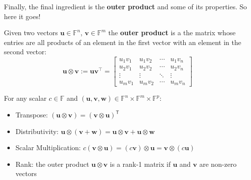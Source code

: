 \documentclass[../lecture-notes.tex]{subfiles}
\begin{document}
Finally, the final ingredient is the \textbf{outer product} and some of its properties. So here it goes!

\begin{definition}
    Given two vectors $\mathbf{u} \in \mathbb{F}^n$, $\mathbf{v} \in \mathbb{F}^m$ the \textbf{outer product} is a
    the matrix whose entries are all products of an element in the first vector with an element 
    in the second vector:
    \begin{equation*}
        \mathbf{u} \otimes \mathbf{v} := \mathbf{u}\mathbf{v}^{\top} = \begin{bmatrix}
            u_1 v_1 & u_1 v_2 & \cdots & u_1 v_n \\
            u_2 v_1 & u_2 v_2 & \cdots & u_2 v_n \\
            \vdots & \vdots & \ddots & \vdots \\
            u_m v_1 & u_m v_2 & \cdots & u_m v_n
        \end{bmatrix}
    \end{equation*}
\end{definition}

\begin{lemma}
    For any scalar $c \in \mathbb{F}$ and $(\mathbf{u}, \mathbf{v}, \mathbf{w}) \in \mathbb{F}^n \times \mathbb{F}^m \times \mathbb{F}^p$:
    \begin{itemize}
        \item Transpose: $(\mathbf{u} \otimes \mathbf{v}) = (\mathbf{v} \otimes \mathbf{u})^{\textsf{T}}$
        \item Distributivity: $\mathbf{u} \otimes (\mathbf{v} + \mathbf{w}) = \mathbf{u} \otimes \mathbf{v} + \mathbf{u} \otimes \mathbf{w}$
        \item Scalar Multiplication: $c(\mathbf{v} \otimes \mathbf{u}) = (c\mathbf{v}) \otimes \mathbf{u} = \mathbf{v} \otimes (c\mathbf{u})$
        \item Rank: the outer product $\mathbf{u} \otimes \mathbf{v}$ is a rank-1 matrix if $\mathbf{u}$ and $\mathbf{v}$ are non-zero
        vectors
    \end{itemize}
\end{lemma}
\end{document}
